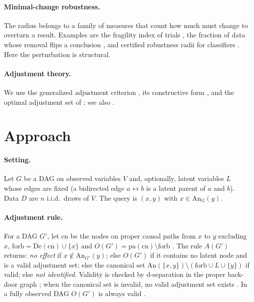 \documentclass[11pt]{article}
\begin{document}
\paragraph{Minimal-change robustness.} The radius belongs to a family of measures that count how much must change to overturn a result. Examples are the fragility index of trials \citep{walsh2014}, the fraction of data whose removal flips a conclusion \citep{broderick2020}, and certified robustness radii for classifiers \citep{cohen2019}. Here the perturbation is structural.

\paragraph{Adjustment theory.} We use the generalized adjustment criterion \citep{shpitser2010,perkovic2018}, its constructive form \citep{vanderzander2019}, and the optimal adjustment set of \citet{henckel2022}; see also \citet{witte2020}.

\section{Approach}\label{sec:approach}

\paragraph{Setting.} Let $G$ be a DAG on observed variables $V$ and, optionally, latent variables $L$ whose edges are fixed (a bidirected edge $a\leftrightarrow b$ is a latent parent of $a$ and $b$). Data $D$ are $n$ i.i.d.\ draws of $V$. The query is $(x,y)$ with $x\in\mathrm{An}_G(y)$.

\paragraph{Adjustment rule.} For a DAG $G'$, let $\mathrm{cn}$ be the nodes on proper causal paths from $x$ to $y$ excluding $x$, $\mathrm{forb}=\mathrm{De}(\mathrm{cn})\cup\{x\}$ and $O(G')=\mathrm{pa}(\mathrm{cn})\setminus\mathrm{forb}$ \citep{henckel2022}. The rule $A(G')$ returns: \emph{no effect} if $x\notin\mathrm{An}_{G'}(y)$; else $O(G')$ if it contains no latent node and is a valid adjustment set; else the canonical set $\mathrm{An}(\{x,y\})\setminus(\mathrm{forb}\cup L\cup\{y\})$ if valid; else \emph{not identified}. Validity is checked by d-separation in the proper back-door graph \citep{vanderzander2019}; when the canonical set is invalid, no valid adjustment set exists \citep{perkovic2018}. In a fully observed DAG $O(G')$ is always valid \citep{henckel2022}.
\end{document}

